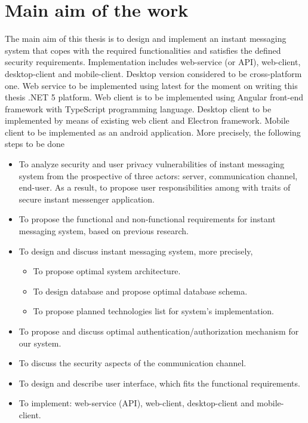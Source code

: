 \chapter{Main aim of the work}\label{ch:main-aim-of-the-work}

The main aim of this thesis is to design and implement an instant messaging system
that copes with the required functionalities and satisfies the defined security requirements.
Implementation includes web-service (or API), web-client, desktop-client and mobile-client.
Desktop version considered to be cross-platform one.
Web service to be implemented using latest for the moment on writing this thesis .NET 5 platform.
Web client is to be implemented using Angular front-end framework with TypeScript programming language.
Desktop client to be implemented by means of existing web client and Electron framework.
Mobile client to be implemented as an android application.
More precisely, the following steps to be done
\begin{itemize}
    \item To analyze security and user privacy vulnerabilities of instant messaging system from the prospective of three
    actors: server, communication channel, end-user.
    As a result, to propose user responsibilities among with traits of secure instant messenger application.
    \item To propose the functional and non-functional requirements for instant messaging system, based on previous
    research.
    \item To design and discuss instant messaging system, more precisely,
    \begin{itemize}
        \item To propose optimal system architecture.
        \item To design database and propose optimal database schema.
        \item To propose planned technologies list for system's implementation.
    \end{itemize}
    \item To propose and discuss optimal authentication/authorization mechanism for our system.
    \item To discuss the security aspects of the communication channel.
    \item To design and describe user interface, which fits the functional requirements.
    \item To implement: web-service (API), web-client, desktop-client and mobile-client.
\end{itemize}